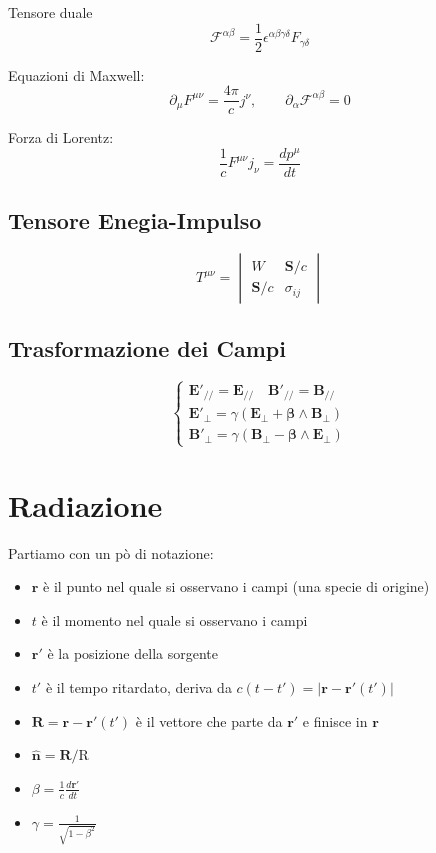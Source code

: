 \documentclass[11pt,a4paper]{report}
\newcommand{\vettore}[1]{\mathbf{#1}}
\newcommand{\vettorec}[1]{\textrm{#1}}
\newcommand{\pvet}[2]{#1\wedge #2}
\begin{document}
			Tensore duale 
			\[
			\mathcal F^{\alpha\beta}=\frac 1 2\epsilon^{\alpha\beta\gamma\delta}F_{\gamma\delta}
			\]

			Equazioni di Maxwell:
			\begin{equation}
				\partial_\mu F^{\mu\nu}=\frac{4\pi}{c}j^\nu,\quad\quad\partial_\alpha\mathcal F^{\alpha\beta}=0
			\end{equation}

			Forza di Lorentz:
			\begin{equation}
				\frac 1 c F^{\mu\nu}j_\nu=\frac{dp^\mu}{dt}
			\end{equation}




		\subsection{Tensore Enegia-Impulso}
			\begin{equation}
				T^{\mu\nu}=
				\begin{vmatrix}
					W & \vettore S/c\\
					\vettore S/c & \sigma_{ij}
				\end{vmatrix}
			\end{equation}

		\subsection{Trasformazione dei Campi}
			\begin{equation}
				\begin{cases}
					\vettore E'_{//}=\vettore E_{//}\quad \vettore B'_{//}=\vettore B_{//}\\
					\vettore E'_{\bot}=\gamma(\vettore E_\bot+
					\pvet{\vettore\beta}{\vettore B_\bot})\\
					\vettore B'_{\bot}=\gamma(\vettore B_\bot-
					\pvet{\vettore\beta}{\vettore E_\bot})
				\end{cases}
			\end{equation}

	\section{Radiazione}
		Partiamo con un pò di notazione:
		\begin{itemize}
			\item $\vettore r$ è il punto nel quale si osservano i campi (una specie di origine)
			\item $t$ è il momento nel quale si osservano i campi
			\item $\vettore r'$ è la posizione della sorgente
			\item $t'$ è il tempo ritardato, deriva da $c(t-t')=|\vettore r-\vettore r'(t')|$
			\item $\vettore R=\vettore r-\vettore r'(t')$ è il vettore che parte da $\vettore r'$ e finisce in $\vettore r$
			\item $\hat{\vettore n}=\vettore R/\vettorec R$
			\item $\beta=\frac1c\frac{d\vettore r'}{dt}$
			\item $\gamma=\frac 1{\sqrt{1-\beta^2}}$
		\end{itemize}
\end{document}
